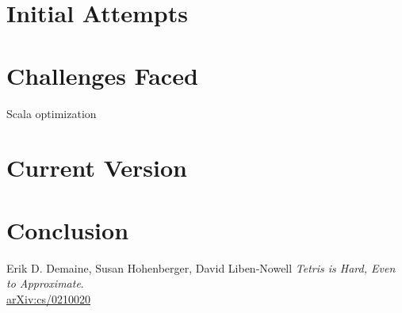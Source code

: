 \documentclass[ fontsize=11pt]{article}
\begin{document}
\section{Initial Attempts}
\label{sec:initial_attempts}

\section{Challenges Faced}
\label{sec:challenges_faced}

\par Scala optimization


\section{Current Version}
\label{sec:current_version}

\section{Conclusion}
\label{sec:conclusion}

\newpage


\begin{thebibliography}{9}
Erik D. Demaine, Susan Hohenberger, David Liben-Nowell
\textit{
Tetris is Hard, Even to Approximate}.
\\\href{https://arxiv.org/abs/cs/0210020}{arXiv:cs/0210020}

\end{thebibliography}
\end{document}
